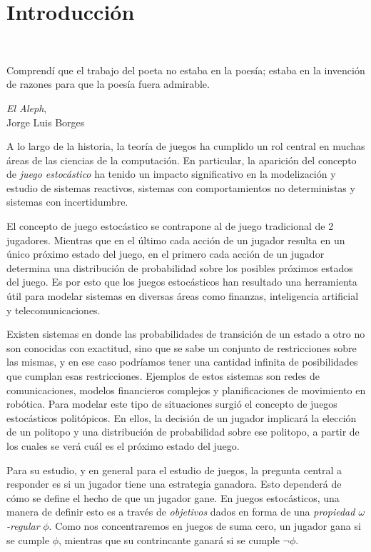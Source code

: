 \chapter{Introducción}
~\label{cap:intro}
\vspace{-1cm}

\epigraph{Comprendí que el trabajo del poeta no
	estaba en la poesía; estaba en la invención de razones para que la poesía fuera
	admirable.}{\textit{El Aleph}, \\ Jorge Luis Borges}

A lo largo de la historia, la teoría de juegos ha cumplido un rol central en
muchas áreas de las ciencias de la computación. En particular, la aparición del
concepto de \textit{juego estocástico} ha tenido un impacto significativo en la
modelización y estudio de sistemas reactivos, sistemas con comportamientos no
deterministas y sistemas con incertidumbre.

El concepto de juego estocástico se contrapone al de juego tradicional de 2
jugadores. Mientras que en el último cada acción de un jugador resulta en un
único próximo estado del juego, en el primero cada acción de un jugador
determina una distribución de probabilidad sobre los posibles próximos estados
del juego. Es por esto que los juegos estocásticos han resultado una
herramienta útil para modelar sistemas en diversas áreas como finanzas,
inteligencia artificial y telecomunicaciones.

Existen sistemas en donde las probabilidades de transición de un estado a otro
no son conocidas con exactitud, sino que se sabe un conjunto de restricciones
sobre las mismas, y en ese caso podríamos tener una cantidad infinita de
posibilidades que cumplan esas restricciones. Ejemplos de estos sistemas son
redes de comunicaciones, modelos financieros complejos y planificaciones de
movimiento en robótica. Para modelar este tipo de situaciones surgió el
concepto de juegos estocásticos politópicos. En ellos, la decisión de un
jugador implicará la elección de un politopo y una distribución de probabilidad
sobre ese politopo, a partir de los cuales se verá cuál es el próximo estado
del juego.

Para su estudio, y en general para el estudio de juegos, la pregunta central a
responder es si un jugador tiene una estrategia ganadora. Esto dependerá de
cómo se define el hecho de que un jugador gane. En juegos estocásticos, una
manera de definir esto es a través de \textit{objetivos} dados en forma de una
\textit{propiedad $\omega$-regular} $\phi$. Como nos concentraremos en juegos
de suma cero, un jugador gana si se cumple $\phi$, mientras que su contrincante
ganará si se cumple $\neg \phi$.

